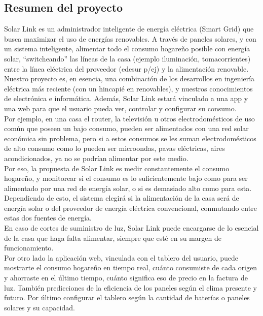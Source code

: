 \subsection{Resumen del proyecto}
Solar Link es un administrador inteligente de energía eléctrica (Smart Grid) que busca maximizar el uso de energías renovables. A través de paneles solares, y con un sistema inteligente, alimentar todo el consumo hogareño posible con energía solar, “switcheando” las líneas de la casa (ejemplo iluminación, tomacorrientes) entre la línea eléctrica del proveedor (edesur p/ej) y la alimentación renovable.\\

Nuestro proyecto es, en esencia, una combinación de los desarrollos en ingeniería eléctrica más reciente (con un hincapié en renovables), y nuestros conocimientos de electrónica e informática. Además, Solar Link estará vinculado a una app y una web para que el usuario pueda ver, controlar y configurar su consumo.\\

Por ejemplo, en una casa el router, la televisión u otros electrodomésticos de uso común que poseen un bajo consumo, pueden ser alimentados con una red solar económica sin problema, pero si a estos consumos se les suman electrodomésticos de alto consumo como lo pueden ser microondas, pavas eléctricas, aires acondicionados, ya no se podrían alimentar por este medio.\\

Por eso, la propuesta de Solar Link es medir constantemente el consumo hogareño, y monitorear si el consumo es lo suficientemente bajo como para ser alimentado por una red de energía solar, o si es demasiado alto como para esta. Dependiendo de esto, el sistema elegirá si la alimentación de la casa será de energía solar o del proveedor de energía eléctrica convencional, conmutando entre estas dos fuentes de energía.\\

En caso de cortes de suministro de luz, Solar Link puede encargarse de lo esencial de la casa que haga falta alimentar, siempre que esté en su margen de funcionamiento.\\

Por otro lado la aplicación web, vinculada con el tablero del usuario, puede mostrarte el consumo hogareño en tiempo real, cuánto consumiste de cada origen y ahorraste en el último tiempo, cuánto significa eso de precio en la factura de luz. También predicciones de la eficiencia de los paneles según el clima presente y futuro. Por último configurar el tablero según la cantidad de baterías o paneles solares y su capacidad.\\

